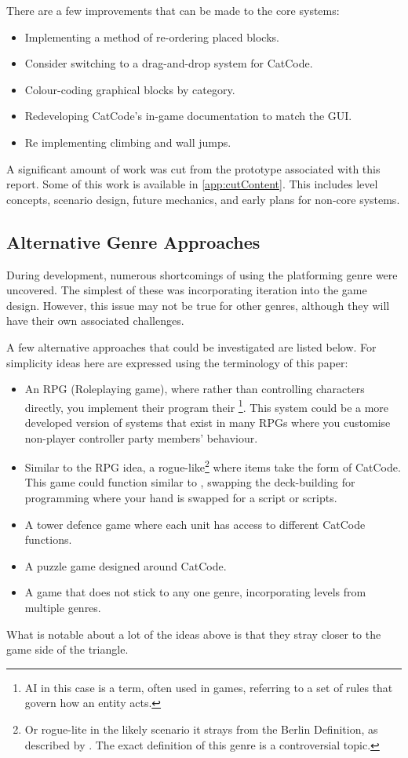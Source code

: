 There are a few improvements that can be made to the core systems:

\begin{itemize}
    \item Implementing a method of re-ordering placed blocks.
    \item Consider switching to a drag-and-drop system for CatCode.
    \item Colour-coding graphical blocks by category.
    \item Redeveloping CatCode's in-game documentation to match the GUI.
    \item Re implementing climbing and wall jumps.
\end{itemize}

A significant amount of work was cut from the prototype associated with this report. Some of this work is available in \autoref{app:cutContent}. This includes level concepts, scenario design, future mechanics, and early plans for non-core systems.

\subsection{Alternative Genre Approaches}

During development, numerous shortcomings of using the platforming genre were uncovered. The simplest of these was incorporating iteration into the game design. However, this issue may not be true for other genres, although they will have their own associated challenges.

A few alternative approaches that could be investigated are listed below. For simplicity ideas here are expressed using the terminology of this paper:

\begin{itemize}
    \item An RPG (Roleplaying game), where rather than controlling characters directly, you implement their program their \footnote{AI in this case is a term, often used in games, referring to a set of rules that govern how an entity acts.}. This system could be a more developed version of systems that exist in many RPGs where you customise non-player controller party members' behaviour.
    \item Similar to the RPG idea, a rogue-like\footnote{Or rogue-lite in the likely scenario it strays from the Berlin Definition, as described by \citep{destructoidRoguelikeDef}. The exact definition of this genre is a controversial topic.} where items take the form of CatCode. This game could function similar to \citep{SlayTheSpire}, swapping the deck-building for programming where your hand is swapped for a script or scripts.
    \item A tower defence game where each unit has access to different CatCode functions.
    \item A puzzle game designed around CatCode.
    \item A game that does not stick to any one genre, incorporating levels from multiple genres.
\end{itemize}

What is notable about a lot of the ideas above is that they stray closer to the game side of the triangle.